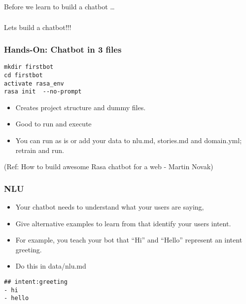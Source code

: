 \begin{frame}[fragile]\frametitle{}
\begin{center}
{\Large Before we learn to build a chatbot \ldots}
\end{center}
\end{frame}

\begin{frame}[fragile]\frametitle{}
\begin{center}
{\Large Lets build a chatbot!!!}
\end{center}
\end{frame}


 \begin{frame}[fragile]\frametitle{Hands-On: Chatbot in 3 files}

\begin{lstlisting}
mkdir firstbot
cd firstbot
activate rasa_env
rasa init  --no-prompt
\end{lstlisting}

\begin{itemize}
\item Creates project structure and dummy files. 
\item Good to run and execute
\item You can run as is or add your data to nlu.md, stories.md and domain.yml; retrain and run.
\end{itemize}

{\tiny (Ref: How to build awesome Rasa chatbot for a web - Martin Novak)}

\end{frame}

 \begin{frame}[fragile]\frametitle{NLU}

\begin{itemize}
\item Your chatbot needs to understand what your users are saying,
\item Give alternative examples to learn from that identify your users intent.
\item For example, you teach your bot that ``Hi'' and ``Hello'' represent an intent greeting. 
\item Do this in data/nlu.md
\end{itemize}


\begin{lstlisting}
## intent:greeting
- hi
- hello
\end{lstlisting}

\end{frame}

